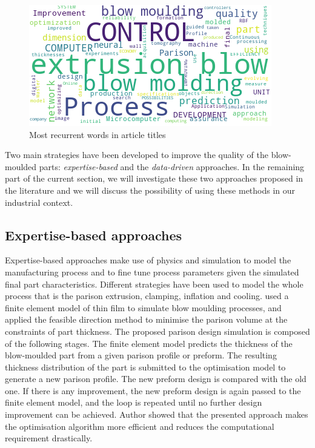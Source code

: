 \begin{figure}
\centerline{\includegraphics[scale=1]{images/chapter_2/wordcloud.png}}
\caption{Most recurrent words in article titles}
\label{fig:wordcloud}
\end{figure}

Two main strategies have been developed to improve the quality of the blow-moulded parts: \textit{expertise-based} and the \textit{data-driven } approaches. In the remaining part of the current section, we will investigate these two approaches proposed in the literature and we will discuss the possibility of using these methods in our industrial context. 


\subsection{Expertise-based approaches} \label{Expertise-based approaches}

Expertise-based approaches make use of physics and simulation to model the manufacturing process and to fine tune process parameters given the simulated final part characteristics. Different strategies have been used to model the whole process that is the parison extrusion, clamping, inflation and cooling. \citet{lee1996prediction} used a finite element model of thin film to simulate blow moulding processes, and applied the feasible direction method to minimise the parison volume at the constraints of part thickness. The proposed parison design simulation is composed of the following stages. The finite element model predicts the thickness of the blow-moulded part from a given parison profile or preform. The resulting thickness distribution of the part is submitted to the optimisation model to generate a new parison profile. The new preform design is compared with the old one. If there is any improvement, the new preform design is again passed to the finite element model, and the loop is repeated until no further design improvement can be achieved. Author showed that the presented approach makes the optimisation algorithm more efficient and reduces the computational requirement drastically. 

